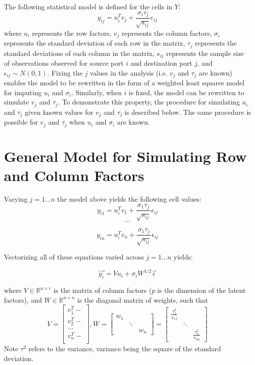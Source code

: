 \documentclass[12pt,twoside]{dukestatscithesis}
\theoremstyle{definition}
\theoremstyle{definition}
\theoremstyle{definition}
\theoremstyle{remark}
\begin{document}
The following statistical model is defined for the cells in \(Y\):
\[y_{ij} = u_i^Tv_j + \frac{\sigma_i \tau_j}{\sqrt{s_{ij}}}\epsilon_{ij}\]
where \(u_i\) represents the row factors, \(v_j\) represents the column
factors, \(\sigma_i\) represents the standard deviation of each row in
the matrix, \(\tau_j\) represents the standard deviations of each column
in the matrix, \(s_{ij}\) represents the sample size of observations
observed for source port \(i\) and destination port \(j\), and
\(\epsilon_{ij} \sim N(0,1)\). Fixing the \(j\) values in the analysis
(i.e. \(v_j\) and \(\tau_j\) are known) enables the model to be
rewritten in the form of a weighted least squares model for imputing
\(u_i\) and \(\sigma_i\). Similarly, when \(i\) is fixed, the model can
be rewritten to simulate \(v_j\) and \(\tau_j\). To demonstrate this
property, the procedure for simulating \(u_i\) and \(\tau_j\) given
known values for \(v_j\) and \(\tau_j\) is described below. The same
procedure is possible for \(v_j\) and \(\tau_j\) when \(u_i\) and
\(\sigma_i\) are known.

\section{General Model for Simulating Row and Column
Factors}\label{general-model-for-simulating-row-and-column-factors}

Varying \(j = 1 ... n\) the model above yields the following cell
values:
\[y_{i1} = u_i^Tv_1 + \frac{\sigma_1 \tau_j}{\sqrt{s_{ij}}}\epsilon_{ij}\]
\[ ... \]

\[ y_{in} = u_i^Tv_n + \frac{\sigma_1 \tau_j}{\sqrt{s_{ij}}}\epsilon_{ij} \]

Vectorizing all of these equations varied across \(j = 1...n\) yields:

\[\vec{y_i} = Vu_i + \sigma_i W^{1/2}\vec{\epsilon}\]

where \(V \in \mathbb{R}^{n \times r}\) is the matrix of column factors
(\(p\) is the dimension of the latent factors), and
\(W \in \mathbb{R}^{n \times n}\) is the diagonal matrix of weights,
such that \[V =
  \begin{bmatrix}
    v_1^T- \\
    v_2^T- \\
    ... \\
    v_n^T- \\
  \end{bmatrix},
  W =
  \begin{bmatrix}
    w_{1} & & \\
    & \ddots & \\
    & & w_{n}
  \end{bmatrix} 
  = \begin{bmatrix}
    \frac{\tau_1^2}{s_{11}} & & \\
    & \ddots & \\
    & & \frac{\tau_n^2}{s_{nn}}
  \end{bmatrix}\]
Note \(\tau^2\) refers to the variance, variance being the square of the
standard deviation.
\end{document}
